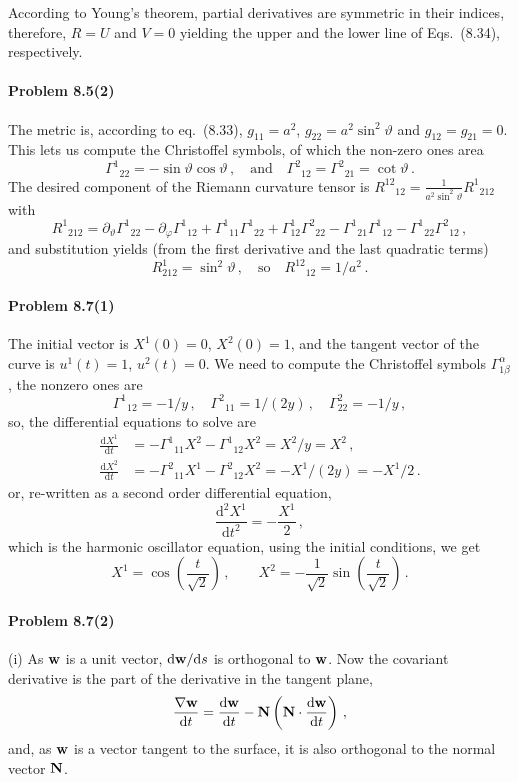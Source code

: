 \documentclass[a4paper,12pt]{article}
\def\d{\mathrm{d}}
\newcommand{\problem}[1]{\paragraph{Problem #1}}
\begin{document}
According to Young's theorem, partial derivatives are symmetric in their indices, therefore, $R=U$ and $V=0$ yielding the upper and the lower line of Eqs.\ (8.34), respectively.


\problem{8.5(2)} The metric is, according to eq.\ (8.33), $g_{11}=a^2$, $g_{22} = a^2 \sin^2 \vartheta$ and $g_{12}=g_{21}=0$. This lets us compute the Christoffel symbols, of which the non-zero ones area
\[
\Gamma^1{}_{22} = -\sin\vartheta\cos\vartheta\,,\quad\text{and}\quad \Gamma^{2}{}_{12}=\Gamma^2{}_{21} = \cot\vartheta\,.
\]
The desired component of the Riemann curvature tensor is $R^{12}{}_{12} = \frac{1}{a^2\sin^2\vartheta}R^1{}_{212}$ with
\[
 R^1{}_{212} = \partial_\vartheta \Gamma^{1}{}_{22} -\partial_\varphi \Gamma^1{}_{12} + \Gamma^1{}_{11}\Gamma^{1}{}_{22}+\Gamma^1_{12}\Gamma^2{}_{22} -\Gamma^1{}_{21}\Gamma^1{}_{12} -\Gamma^1{}_{22}\Gamma^2{}_{12}\,,
\]
and substitution yields (from the first derivative and the last quadratic terms)
\[
 R^1_{212} = \sin^2\vartheta\,,\quad\text{so}\quad R^{12}{}_{12} = 1/a^2\,.
\]


\problem{8.7(1)} The initial vector is $X^1(0)=0$, $X^2(0)=1$, and the tangent vector of the curve is $u^1(t)=1$, $u^2(t)=0$.
We need to compute the Christoffel symbols $\Gamma^\alpha_{1\beta}$, the nonzero ones are
\[
 \Gamma^1{}_{12} = -1/y\,,\quad \Gamma^{2}{}_{11} = 1/(2y)\,,\quad \Gamma^2_{22} = -1/y\,,
\]
so, the differential equations to solve are
\[
\begin{aligned}
 \frac{\d X^1}{\d t} &= -\Gamma^1{}_{11}X^2 - \Gamma^1{}_{12}X^2 = X^2/y = X^2\,,\\
 \frac{\d X^2}{\d t} &= -\Gamma^2{}_{11}X^1 - \Gamma^2{}_{12}X^2 = -X^1/(2y) = -X^1/2\,.
\end{aligned}
\]
or, re-written as a second order differential equation,
\[
 \frac{\d^2 X^1}{\d t^2} = -\frac{X^1}{2}\,,
\]
which is the harmonic oscillator equation, using the initial conditions, we get
\[
 X^1 = \cos\left(\frac{t}{\sqrt{2}}\right)\,,\quad\quad X^2 = -\frac{1}{\sqrt{2}}\sin\left(\frac{t}{\sqrt{2}}\right)\,.
\]


\problem{8.7(2)} (i) As ${\bf w}$ is a unit vector, $\d {\bf w}/\d s$ is orthogonal to ${\bf w}$. Now the covariant derivative is the part of the derivative in the tangent plane,
\[
 \frac{\nabla\bf w}{\d t} = \frac{\d\bf w}{\d t} - {\bf N}\left( {\bf N}\cdot\frac{\d\bf w}{\d t}\right)\,,
\]
and, as ${\bf w}$ is a vector tangent to the surface, it is also orthogonal to the normal vector ${\bf N}$.
\end{document}
